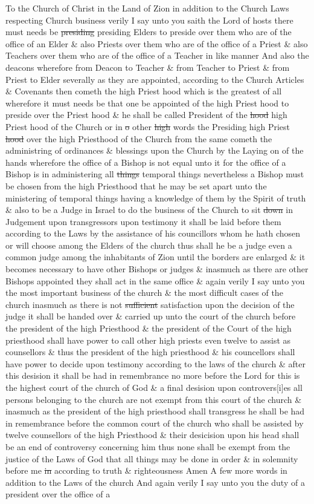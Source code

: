 {				To the Church of Christ in the Land of Zion in addition to the Church Laws respecting Church business verily I say unto you saith the Lord of hosts there must needs be \sout{presiding} presiding Elders to preside over them who are of the office of an Elder \& also Priests over them who are of the office of a Priest \& also Teachers over them who are of the office of a Teacher in like manner And also the deacons wherefore from Deacon to Teacher \& from Teacher to Priest \& from Priest to Elder severally as they are appointed, according to the Church Articles \& Covenants then cometh the high Priest hood which is the greatest of all wherefore it must needs be that one be appointed of the high Priest hood to preside over the Priest hood \& he shall be called President of the \sout{hood} high Priest hood of the Church or in \sout{o} other \sout{high} words the Presiding high Priest \sout{hood} over the high Priesthood of the Church from the same cometh the administring of ordinances \& blessings upon the Church by the Laying on of the hands wherefore the office of a Bishop is not equal unto it for the office of a Bishop is in administering all \sout{things} temporal things nevertheless a Bishop must be chosen from the high Priesthood that he may be set apart unto the ministering of temporal things having a knowledge of them by the Spirit of truth \& also to be a Judge in Israel to do the business of the Church to sit \sout{down} in Judgement upon transgressors upon testimony it shall be laid before them according to the Laws by the assistance of his councillors whom he hath chosen or will choose among the Elders of the church thus shall he be a judge even a common judge among the inhabitants of Zion until the borders are enlarged \& it becomes necessary to have other Bishops or judges \& inasmuch as there are other Bishops appointed they shall act in the same office \& again verily I say unto you the most important business of the church \& the most difficult cases of the church inasmuch as there is not \sout{sufficient} satisfaction upon the decision of the judge it shall be handed over \& carried up unto the court of the church before the president of the high Priesthood \& the president of the Court of the high priesthood shall have power to call other high priests even twelve to assist as counsellors \& thus the president of the high priesthood \& his councellors shall have power to decide upon testimony according to the laws of the church \& after this desision it shall be had in remembrance no more before the Lord for this is the highest court of the church of God \& a final desision upon controvers[i]es all persons belonging to the church are not exempt from this court of the church \& inasmuch as the president of the high priesthood shall transgress he shall be had in remembrance before the common court of the church who shall be assisted by twelve counsellors of the high Priesthood \& their desicision upon his head shall be an end of controversy concerning him thus none shall be exempt from the justice of the Laws of God that all things may be done in order \& in solemnity before me \sout{in} according to truth \& righteousness Amen A few more words in addition to the Laws of the church And again verily I say unto you the duty of a president over the office of a }
